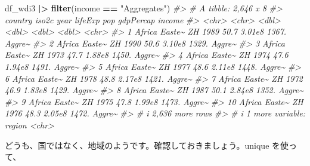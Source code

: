 \documentclass[
  xelatex, ja=standard]{bxjsbook}
\newenvironment{Shaded}{\begin{snugshade}}{\end{snugshade}}
\newcommand{\CommentTok}[1]{\textcolor[rgb]{0.56,0.35,0.01}{\textit{#1}}}
\newcommand{\FunctionTok}[1]{\textcolor[rgb]{0.13,0.29,0.53}{\textbf{#1}}}
\newcommand{\NormalTok}[1]{#1}
\newcommand{\SpecialCharTok}[1]{\textcolor[rgb]{0.81,0.36,0.00}{\textbf{#1}}}
\newcommand{\StringTok}[1]{\textcolor[rgb]{0.31,0.60,0.02}{#1}}
\theoremstyle{definition}
\theoremstyle{definition}
\theoremstyle{definition}
\theoremstyle{definition}
\theoremstyle{remark}
\begin{document}
\begin{Shaded}
\begin{Highlighting}[]
\NormalTok{df\_wdi3 }\SpecialCharTok{|\textgreater{}} \FunctionTok{filter}\NormalTok{(income }\SpecialCharTok{==} \StringTok{"Aggregates"}\NormalTok{)}
\CommentTok{\#\textgreater{} \# A tibble: 2,646 x 8}
\CommentTok{\#\textgreater{}    country       iso2c  year lifeExp    pop gdpPercap income}
\CommentTok{\#\textgreater{}    \textless{}chr\textgreater{}         \textless{}chr\textgreater{} \textless{}dbl\textgreater{}   \textless{}dbl\textgreater{}  \textless{}dbl\textgreater{}     \textless{}dbl\textgreater{} \textless{}chr\textgreater{} }
\CommentTok{\#\textgreater{}  1 Africa Easte\textasciitilde{} ZH     1989    50.7 3.01e8     1367. Aggre\textasciitilde{}}
\CommentTok{\#\textgreater{}  2 Africa Easte\textasciitilde{} ZH     1990    50.6 3.10e8     1329. Aggre\textasciitilde{}}
\CommentTok{\#\textgreater{}  3 Africa Easte\textasciitilde{} ZH     1973    47.7 1.88e8     1450. Aggre\textasciitilde{}}
\CommentTok{\#\textgreater{}  4 Africa Easte\textasciitilde{} ZH     1974    47.6 1.94e8     1491. Aggre\textasciitilde{}}
\CommentTok{\#\textgreater{}  5 Africa Easte\textasciitilde{} ZH     1977    48.6 2.11e8     1448. Aggre\textasciitilde{}}
\CommentTok{\#\textgreater{}  6 Africa Easte\textasciitilde{} ZH     1978    48.8 2.17e8     1421. Aggre\textasciitilde{}}
\CommentTok{\#\textgreater{}  7 Africa Easte\textasciitilde{} ZH     1972    46.9 1.83e8     1429. Aggre\textasciitilde{}}
\CommentTok{\#\textgreater{}  8 Africa Easte\textasciitilde{} ZH     1987    50.1 2.84e8     1352. Aggre\textasciitilde{}}
\CommentTok{\#\textgreater{}  9 Africa Easte\textasciitilde{} ZH     1975    47.8 1.99e8     1473. Aggre\textasciitilde{}}
\CommentTok{\#\textgreater{} 10 Africa Easte\textasciitilde{} ZH     1976    48.3 2.05e8     1472. Aggre\textasciitilde{}}
\CommentTok{\#\textgreater{} \# i 2,636 more rows}
\CommentTok{\#\textgreater{} \# i 1 more variable: region \textless{}chr\textgreater{}}
\end{Highlighting}
\end{Shaded}

どうも、国ではなく、地域のようです。確認しておきましょう。unique を使って、
\end{document}
